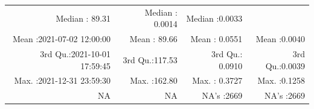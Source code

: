 \documentclass[
  10pt,
  a4paper,oneside]{article}
\begin{document}
\begin{longtable}[]{@{}rrrr@{}}
\begin{minipage}[t]{0.18\columnwidth}
Median : 89.31\strut
\end{minipage} & \begin{minipage}[t]{0.19\columnwidth}\raggedleft
Median : 0.0014\strut
\end{minipage} & \begin{minipage}[t]{0.19\columnwidth}\raggedleft
Median :0.0033\strut
\end{minipage}\tabularnewline
\begin{minipage}[t]{0.32\columnwidth}\raggedleft
Mean :2021-07-02 12:00:00\strut
\end{minipage} & \begin{minipage}[t]{0.18\columnwidth}\raggedleft
Mean : 89.66\strut
\end{minipage} & \begin{minipage}[t]{0.19\columnwidth}\raggedleft
Mean : 0.0551\strut
\end{minipage} & \begin{minipage}[t]{0.19\columnwidth}\raggedleft
Mean :0.0040\strut
\end{minipage}\tabularnewline
\begin{minipage}[t]{0.32\columnwidth}\raggedleft
3rd Qu.:2021-10-01 17:59:45\strut
\end{minipage} & \begin{minipage}[t]{0.18\columnwidth}\raggedleft
3rd Qu.:117.53\strut
\end{minipage} & \begin{minipage}[t]{0.19\columnwidth}\raggedleft
3rd Qu.: 0.0910\strut
\end{minipage} & \begin{minipage}[t]{0.19\columnwidth}\raggedleft
3rd Qu.:0.0039\strut
\end{minipage}\tabularnewline
\begin{minipage}[t]{0.32\columnwidth}\raggedleft
Max. :2021-12-31 23:59:30\strut
\end{minipage} & \begin{minipage}[t]{0.18\columnwidth}\raggedleft
Max. :162.80\strut
\end{minipage} & \begin{minipage}[t]{0.19\columnwidth}\raggedleft
Max. : 0.3727\strut
\end{minipage} & \begin{minipage}[t]{0.19\columnwidth}\raggedleft
Max. :0.1258\strut
\end{minipage}\tabularnewline
\begin{minipage}[t]{0.32\columnwidth}\raggedleft
NA\strut
\end{minipage} & \begin{minipage}[t]{0.18\columnwidth}\raggedleft
NA\strut
\end{minipage} & \begin{minipage}[t]{0.19\columnwidth}\raggedleft
NA's :2669\strut
\end{minipage} & \begin{minipage}[t]{0.19\columnwidth}\raggedleft
NA's :2669\strut
\end{minipage}\tabularnewline
\bottomrule
\end{longtable}
\end{document}
